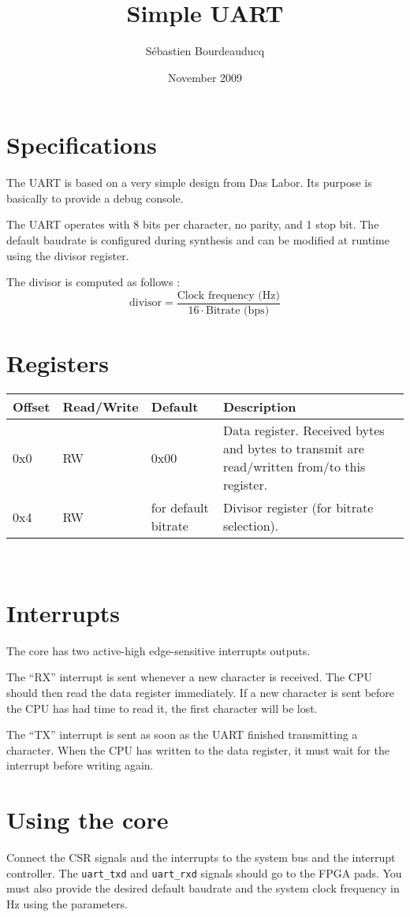 \documentclass[a4paper,11pt]{article}
\title{Simple UART}
\author{S\'ebastien Bourdeauducq}
\date{November 2009}
\begin{document}
\setlength{\parindent}{0pt}
\setlength{\parskip}{5pt}
\maketitle{}
\section{Specifications}
The UART is based on a very simple design from Das Labor. Its purpose is basically to provide a debug console.

The UART operates with 8 bits per character, no parity, and 1 stop bit. The default baudrate is configured during synthesis and can be modified at runtime using the divisor register.

The divisor is computed as follows :
\begin{equation*}
\text{divisor} = \frac{\text{Clock frequency (Hz)}}{16 \cdot \text{Bitrate (bps)}}
\end{equation*}

\section{Registers}
\begin{tabularx}{\textwidth}{|l|l|l|X|}
\hline
\bf{Offset} & \bf{Read/Write} & \bf{Default} & \bf{Description} \\
\hline
0x0 & RW & 0x00 & Data register. Received bytes and bytes to transmit are read/written from/to this register. \\
\hline
0x4 & RW & for default bitrate & Divisor register (for bitrate selection). \\
\hline
\end{tabularx}\\

\section{Interrupts}
The core has two active-high edge-sensitive interrupts outputs.

The ``RX'' interrupt is sent whenever a new character is received. The CPU should then read the data register immediately. If a new character is sent before the CPU has had time to read it, the first character will be lost.

The ``TX'' interrupt is sent as soon as the UART finished transmitting a character. When the CPU has written to the data register, it must wait for the interrupt before writing again.

\section{Using the core}
Connect the CSR signals and the interrupts to the system bus and the interrupt controller. The \verb!uart_txd! and \verb!uart_rxd! signals should go to the FPGA pads. You must also provide the desired default baudrate and the system clock frequency in Hz using the parameters.
\end{document}
